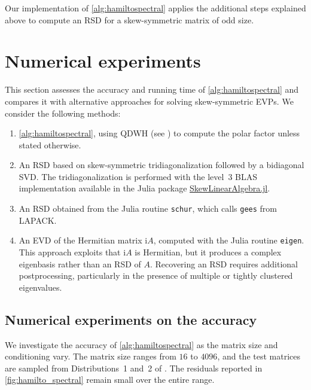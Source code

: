 \documentclass[final,onefignum,onetabnum,dvipsnames]{siamart251216}
\numberwithin{algorithm}{section}
\numberwithin{equation}{section}
\begin{document}
Our implementation of \cref{alg:hamiltospectral}
applies the additional steps explained above to compute an RSD for a skew-symmetric matrix of odd size.%




\section{Numerical experiments}\label{sec:experiments}
This section assesses the accuracy and running time of
\cref{alg:hamiltospectral} and compares it with alternative approaches
for solving skew-symmetric EVPs. We consider the following methods:
\begin{enumerate}
    \item \cref{alg:hamiltospectral}, using QDWH (see ) to compute the polar
    factor unless stated otherwise.
    \item An RSD based on skew-symmetric tridiagonalization followed by
    a bidiagonal SVD. The tridiagonalization is performed with the
    level~3 BLAS implementation available in the Julia package
    \href{https://github.com/JuliaLinearAlgebra/SkewLinearAlgebra.jl}{SkewLinearAlgebra.jl}.
    \item An RSD obtained from the Julia routine \texttt{schur}, which
    calls \texttt{gees} from LAPACK.
    \item An EVD of the Hermitian matrix $\mathrm{i}A$, computed with
    the Julia routine \texttt{eigen}.
    This approach exploits that $\mathrm{i}A$ is Hermitian, but it produces a complex
eigenbasis rather than an RSD of $A$. Recovering an RSD requires additional postprocessing, particularly in the presence of multiple or tightly clustered eigenvalues.
\end{enumerate}

\subsection{Numerical experiments on the accuracy}
We investigate the accuracy of \cref{alg:hamiltospectral} as the
matrix size and conditioning vary. The matrix size ranges from $16$
to $4096$, and the test matrices are sampled from Distributions~1
and~2 of . The residuals reported in \cref{fig:hamilto_spectral} remain small over
the entire range.
\end{document}
